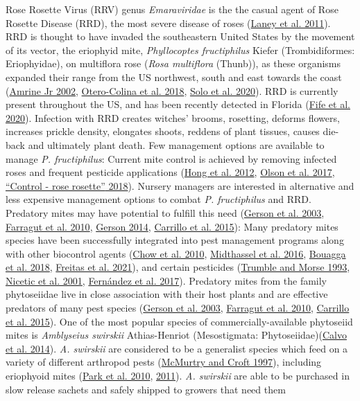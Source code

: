 \documentclass[12pt,final,CPage]{ufthesis}
\begin{document}
{  Rose Rosette Virus (RRV) genus \emph{Emaraviridae} is the the casual agent of Rose Rosette Disease (RRD), the most severe disease of roses (\protect\hyperlink{ref-Laney2011}{Laney et al. 2011}). RRD is thought to have invaded the southeastern United States by the movement of its vector, the eriophyid mite, \emph{Phyllocoptes fructiphilus} Kiefer (Trombidiformes: Eriophyidae), on multiflora rose (\emph{Rosa multiflora} (Thunb)), as these organisms expanded their range from the US northwest, south and east towards the coast (\protect\hyperlink{ref-Amrine2002}{Amrine Jr 2002}, \protect\hyperlink{ref-Otero-Colina2018}{Otero-Colina et al. 2018}, \protect\hyperlink{ref-Solo2020}{Solo et al. 2020}). RRD is currently present throughout the US, and has been recently detected in Florida (\protect\hyperlink{ref-Fife2020}{Fife et al. 2020}). Infection with RRD creates witches' brooms, rosetting, deforms flowers, increases prickle density, elongates shoots, reddens of plant tissues, causes die-back and ultimately plant death. Few management options are available to manage \emph{P. fructiphilus}: Current mite control is achieved by removing infected roses and frequent pesticide applications (\protect\hyperlink{ref-Hong2012}{Hong et al. 2012}, \protect\hyperlink{ref-Olson2017}{Olson et al. 2017}, \protect\hyperlink{ref-UGA2018}{{``Control - rose rosette''} 2018}). Nursery managers are interested in alternative and less expensive management options to combat \emph{P. fructiphilus} and RRD. Predatory mites may have potential to fulfill this need (\protect\hyperlink{ref-Gerson2003}{Gerson et al. 2003}, \protect\hyperlink{ref-Farragut2010}{Farragut et al. 2010}, \protect\hyperlink{ref-Gerson2014}{Gerson 2014}, \protect\hyperlink{ref-Carrillo2015}{Carrillo et al. 2015}): Many predatory mites species have been successfully integrated into pest management programs along with other biocontrol agents (\protect\hyperlink{ref-Chow2010}{Chow et al. 2010}, \protect\hyperlink{ref-Midthassel2016}{Midthassel et al. 2016}, \protect\hyperlink{ref-Bouagga2018}{Bouagga et al. 2018}, \protect\hyperlink{ref-Freitas2021}{Freitas et al. 2021}), and certain pesticides (\protect\hyperlink{ref-Trumble1993}{Trumble and Morse 1993}, \protect\hyperlink{ref-Nicetic2001}{Nicetic et al. 2001}, \protect\hyperlink{ref-Fernandez2017}{Fernández et al. 2017}). Predatory mites from the family phytoseiidae live in close association with their host plants and are effective predators of many pest species (\protect\hyperlink{ref-Gerson2003}{Gerson et al. 2003}, \protect\hyperlink{ref-Farragut2010}{Farragut et al. 2010}, \protect\hyperlink{ref-Carrillo2015}{Carrillo et al. 2015}). One of the most popular species of commercially-available phytoseiid mites is \emph{Amblyseius swirskii} Athias-Henriot (Mesostigmata: Phytoseiidae)(\protect\hyperlink{ref-Calvo2014}{Calvo et al. 2014}). \emph{A. swirskii} are considered to be a generalist species which feed on a variety of different arthropod pests (\protect\hyperlink{ref-McMurtry1997}{McMurtry and Croft 1997}), including eriophyoid mites (\protect\hyperlink{ref-Park2010}{Park et al. 2010}, \protect\hyperlink{ref-Park2011}{2011}). \emph{A. swirskii} are able to be purchased in slow release sachets and safely shipped to growers that need them }
\end{document}
